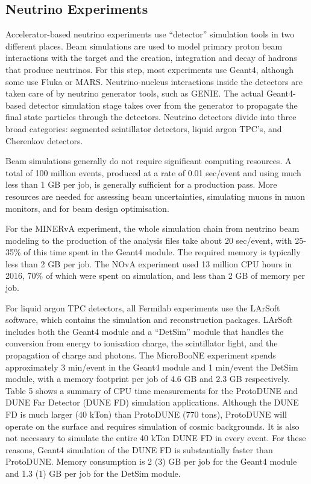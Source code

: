 \documentclass[12pt,a4paper]{article}
\begin{document}
{\hypertarget{neutrino-experiments}{%
\subsection{Neutrino Experiments}\label{neutrino-experiments}}

Accelerator-based neutrino experiments use ``detector'' simulation tools
in two different places. Beam simulations are used to model primary
proton beam interactions with the target and the creation, integration
and decay of hadrons that produce neutrinos. For this step, most
experiments use Geant4, although some use Fluka or MARS.
Neutrino-nucleus interactions inside the detectors are taken care of by
neutrino generator tools, such as GENIE. The actual Geant4-based
detector simulation stage takes over from the generator to propagate the
final state particles through the detectors. Neutrino detectors divide
into three broad categories: segmented scintillator detectors, liquid
argon TPC's, and Cherenkov detectors.

Beam simulations generally do not require significant computing
resources. A total of 100 million events, produced at a rate of 0.01
sec/event and using much less than 1 GB per job, is generally sufficient
for a production pass. More resources are needed for assessing beam
uncertainties, simulating muons in muon monitors, and for beam design
optimisation.

For the MINERvA experiment, the whole simulation chain from neutrino
beam modeling to the production of the analysis files take about 20
sec/event, with 25-35\% of this time spent in the Geant4 module. The
required memory is typically less than 2 GB per job. The NOvA experiment
used 13 million CPU hours in 2016, 70\% of which were spent on
simulation, and less than 2 GB of memory per job.

For liquid argon TPC detectors, all Fermilab experiments use the LArSoft
software, which contains the simulation and reconstruction
packages. LArSoft includes both the Geant4 module and a ``DetSim''
module that handles the conversion from energy to ionisation charge, the
scintillator light, and the propagation of charge and photons. The
MicroBooNE experiment spends approximately 3 min/event in the Geant4
module and 1 min/event the DetSim module, with a memory footprint per
job of 4.6 GB and 2.3 GB respectively. Table 5 shows a summary of CPU
time measurements for the ProtoDUNE and DUNE Far Detector (DUNE FD)
simulation applications. Although the DUNE FD is much larger (40 kTon)
than ProtoDUNE (770 tons), ProtoDUNE will operate on the surface and
requires simulation of cosmic backgrounds. It is also not necessary to
simulate the entire 40 kTon DUNE FD in every event. For these reasons,
Geant4 simulation of the DUNE FD is substantially faster than ProtoDUNE.
Memory consumption is 2 (3) GB per job for the Geant4 module and 1.3 (1)
GB per job for the DetSim module.

}
\end{document}
